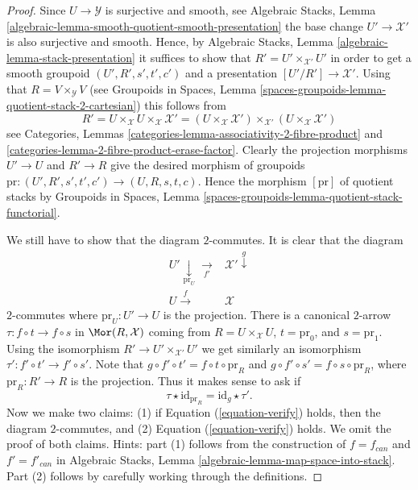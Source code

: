 \begin{proof}
Since $U \to \mathcal{Y}$ is surjective and smooth, see
Algebraic Stacks,
Lemma \ref{algebraic-lemma-smooth-quotient-smooth-presentation}
the base change $U' \to \mathcal{X}'$ is also surjective and smooth.
Hence, by
Algebraic Stacks,
Lemma \ref{algebraic-lemma-stack-presentation}
it suffices to show that $R' = U' \times_{\mathcal{X}'} U'$ in order to
get a smooth groupoid $(U', R', s', t', c')$ and a presentation
$[U'/R'] \to \mathcal{X}'$.
Using that $R = V \times_\mathcal{Y} V$ (see
Groupoids in Spaces,
Lemma \ref{spaces-groupoids-lemma-quotient-stack-2-cartesian})
this follows from
$$
R' =
U \times_\mathcal{X} U \times_\mathcal{X} \mathcal{X}' =
(U \times_\mathcal{X} \mathcal{X}')
\times_{\mathcal{X}'}
(U \times_\mathcal{X} \mathcal{X}')
$$
see
Categories, Lemmas \ref{categories-lemma-associativity-2-fibre-product} and
\ref{categories-lemma-2-fibre-product-erase-factor}.
Clearly the projection morphisms $U' \to U$ and $R' \to R$ give the
desired morphism of groupoids
$\text{pr} : (U', R', s', t', c') \to (U, R, s, t, c)$.
Hence the morphism $[\text{pr}]$ of quotient stacks by
Groupoids in Spaces,
Lemma \ref{spaces-groupoids-lemma-quotient-stack-functorial}.

\medskip\noindent
We still have to show that the diagram $2$-commutes.
It is clear that the diagram
$$
\begin{array}{cc}U' \underset{\text{pr}_U}{\downarrow}\underset{f'}{\longrightarrow} & \mathcal{X}' \overset{g}{\downarrow} \\ U \overset{f}{\longrightarrow} & \mathcal{X}\end{array}
$$
$2$-commutes where $\text{pr}_U : U' \to U$ is the projection.
There is a canonical $2$-arrow
$\tau : f \circ t \to f \circ s$ in $\Mor(R, \mathcal{X})$
coming from $R = U \times_\mathcal{X} U$, $t = \text{pr}_0$, and
$s = \text{pr}_1$. Using the isomorphism
$R' \to U' \times_{\mathcal{X}'} U'$ we get similarly an isomorphism
$\tau' : f' \circ t' \to f' \circ s'$. Note that
$g \circ f' \circ t' = f \circ t \circ \text{pr}_R$ and
$g \circ f' \circ s' = f \circ s \circ \text{pr}_R$, where
$\text{pr}_R : R' \to R$ is the projection. Thus it makes sense to ask
if
\begin{equation}
\label{equation-verify}
\tau \star \text{id}_{\text{pr}_R} = \text{id}_g \star \tau'.
\end{equation}
Now we make two claims: (1) if Equation (\ref{equation-verify}) holds,
then the diagram $2$-commutes, and (2) Equation (\ref{equation-verify}) holds.
We omit the proof of both claims. Hints: part (1) follows from the
construction of $f = f_{can}$ and $f' = f'_{can}$ in
Algebraic Stacks, Lemma \ref{algebraic-lemma-map-space-into-stack}.
Part (2) follows by carefully working through the definitions.
\end{proof}

